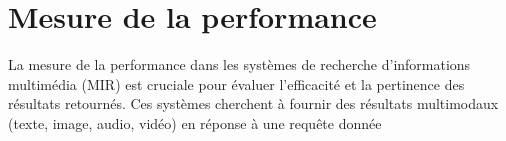 \begin{section}

 \section{Mesure de la performance}
 La mesure de la performance dans les systèmes de recherche d'informations multimédia (MIR) est cruciale pour évaluer l'efficacité et la pertinence des résultats retournés. Ces systèmes cherchent à fournir des résultats multimodaux (texte, image, audio, vidéo) en réponse à une requête donnée

\end{section}
